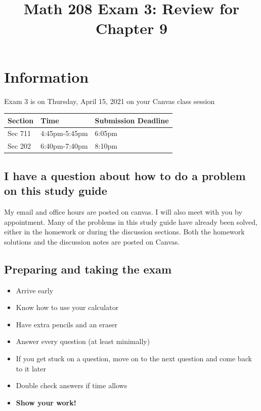 \documentclass[12pt]{extarticle}
\begin{document}
\title{\vspace{-5ex}Math 208 Exam 3: Review for Chapter 9}
\author{}
\date{\vspace{-5ex}}
\maketitle

\vspace{-5ex}
\section{Information}

Exam 3 is on Thursday, April 15, 2021 on your Canvas class session

\begin{table}[h]
	\begin{tabular}{lll}
		\hline
		\textbf{Section} & \textbf{Time} & \textbf{Submission Deadline}   \\ \hline
		Sec 711          & 4:45pm-5:45pm  & 6:05pm \\ \hline
		Sec 202          & 6:40pm-7:40pm	& 8:10pm  \\ \hline
	\end{tabular}
\end{table}

\subsection{I have a question about how to do a problem on this study guide}
My email and office hours are posted on canvas. I will also meet with you by appointment. Many of the problems in this study guide have already been solved, either in the homework or during the discussion sections. Both the homework solutions and the discussion notes are posted on Canvas.


\subsection{Preparing and taking the exam}
\begin{itemize}
	\item Arrive early
	\item Know how to use your calculator
	\item Have extra pencils and an eraser
	\item Answer every question (at least minimally)
	\item If you get stuck on a question, move on to the next question and come back to it later
	\item Double check answers if time allows
	\item \textbf{Show your work!}
\end{itemize}
\end{document}
